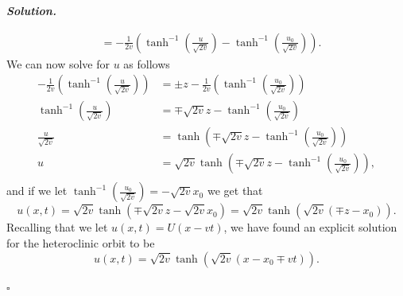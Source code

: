 \documentclass[12pt]{report}
\newenvironment{solution}[1][\it{Solution}]{\textbf{#1. } }{$\square$}
\newcommand{\paren}[1]{{\left(#1\right)}} %
\begin{document}
\begin{solution}
\begin{enumerate}
\begin{align*}
            &= -\frac{1}{2v}\paren{\tanh^{-1}\paren{\frac{u}{\sqrt{2v}}}-\tanh^{-1}\paren{\frac{u_0}{\sqrt{2v}}}}.
        \end{align*}
        We can now solve for $u$ as follows
        \begin{align*}
            -\frac{1}{2v}\paren{\tanh^{-1}\paren{\frac{u}{\sqrt{2v}}}} &= \pm z -  \frac{1}{2v}\paren{\tanh^{-1}\paren{\frac{u_0}{\sqrt{2v}}}}\\
            \tanh^{-1}\paren{\frac{u}{\sqrt{2v}}} &= \mp \sqrt{2v} z -  \tanh^{-1}\paren{\frac{u_0}{\sqrt{2v}}}\\
            \frac{u}{\sqrt{2v}} &= \tanh\paren{\mp \sqrt{2v} z -  \tanh^{-1}\paren{\frac{u_0}{\sqrt{2v}}}}\\
            u &= \sqrt{2v}\tanh\paren{\mp \sqrt{2v} z -  \tanh^{-1}\paren{\frac{u_0}{\sqrt{2v}}}},\\
        \end{align*}
        and if we let $\tanh^{-1}\paren{\frac{u_0}{\sqrt{2v}}} = -\sqrt{2v}x_0$ we get that
        \[
            u(x,t) = \sqrt{2v}\tanh(\mp\sqrt{2v}z - \sqrt{2v}x_0) = \sqrt{2v}\tanh(\sqrt{2v}(\mp z - x_0)). 
        \]
        Recalling that we let $u(x,t) = U(x-vt)$, we have found an explicit solution for the heteroclinic orbit to be
        \[
            u(x,t) = \sqrt{2v}\tanh(\sqrt{2v}(x - x_0 \mp v t)).
        \]
    \end{enumerate}
\end{solution}

\newpage


\end{document}
